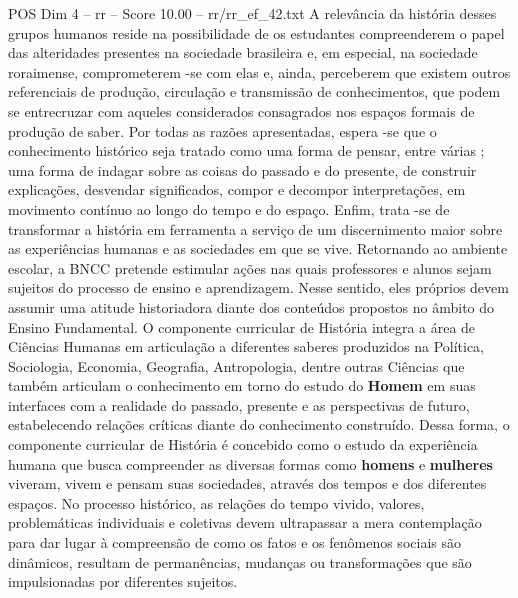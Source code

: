 \begin{textsample}{POS Dim 4 – rr – Score 10.00 – rr/rr\_ef\_42.txt}
A relevância da história desses grupos humanos reside na possibilidade de os estudantes compreenderem o papel das alteridades presentes na sociedade brasileira e, em especial, na sociedade roraimense, comprometerem -se com elas e, ainda, perceberem que existem outros referenciais de produção, circulação e transmissão de conhecimentos, que podem se entrecruzar com aqueles considerados consagrados nos espaços formais de produção de saber.
Por todas as razões apresentadas, espera -se que o conhecimento histórico seja tratado como uma forma de pensar, entre várias ; uma forma de indagar sobre as coisas do passado e do presente, de construir explicações, desvendar significados, compor e decompor interpretações, em movimento contínuo ao longo do tempo e do espaço.
Enfim, trata -se de transformar a história em ferramenta a serviço de um discernimento maior sobre as experiências humanas e as sociedades em que se vive.
Retornando ao ambiente escolar, a BNCC pretende estimular ações nas quais professores e alunos sejam sujeitos do processo de ensino e aprendizagem.
Nesse sentido, eles próprios devem assumir uma atitude historiadora diante dos conteúdos propostos no âmbito do Ensino Fundamental.
O componente curricular de História integra a área de Ciências Humanas em articulação a diferentes saberes produzidos na Política, Sociologia, Economia, Geografia, Antropologia, dentre outras Ciências que também articulam o conhecimento em torno do estudo do \textbf{Homem} em suas interfaces com a realidade do passado, presente e as perspectivas de futuro, estabelecendo relações críticas diante do conhecimento construído.
Dessa forma, o componente curricular de História é concebido como o estudo da experiência humana que busca compreender as diversas formas como \textbf{homens} e \textbf{mulheres} viveram, vivem e pensam suas sociedades, através dos tempos e dos diferentes espaços.
No processo histórico, as relações do tempo vivido, valores, problemáticas individuais e coletivas devem ultrapassar a mera contemplação para dar lugar à compreensão de como os fatos e os fenômenos sociais são dinâmicos, resultam de permanências, mudanças ou transformações que são impulsionadas por diferentes sujeitos.

\end{textsample}
